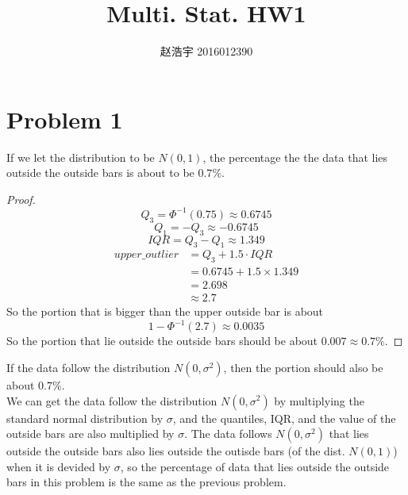 \message{ !name(hw1.tex)}\documentclass{article}
\title{\textbf{Multi. Stat. HW1}}
\author{赵浩宇 2016012390}
\date{}
\begin{document}

\begin{CJK}{UTF8}{gbsn}
  \maketitle
\end{CJK}

\section{Problem 1}
If we let the distribution to be $N(0,1)$, the percentage the the data that lies outside the outside bars is about to be $0.7\%$.
\begin{proof}
  \begin{equation*}
    Q_3  = \Phi^{-1}\left(0.75\right)
        \approx 0.6745
  \end{equation*}
  \begin{equation*}
    Q_1  = -Q_3
         \approx -0.6745
  \end{equation*}
  \begin{equation*}
    IQR  = Q_3 - Q_1
         \approx 1.349
  \end{equation*}
  \begin{align*}
    upper\_outlier  &= Q_3 + 1.5 \cdot IQR\\
                    &= 0.6745 + 1.5 \times 1.349\\
                    &= 2.698\\
                    &\approx 2.7
  \end{align*}
  So the portion that is bigger than the upper outside bar is about
  \begin{equation*}
    1 - \Phi^{-1}\left(2.7\right) \approx 0.0035
  \end{equation*}
  So the portion that lie outside the outside bars should be about $0.007 \approx 0.7\%$.
\end{proof}
If the data follow the distribution $N(0, \sigma^2)$, then the portion should also be about $0.7\%$.\\
 We can get the data follow the distribution $N(0,\sigma^2)$ by multiplying the standard normal distribution by $\sigma$, and the quantiles, IQR, and the value of the outside bars are also multiplied by $\sigma$. The data follows $N(0,\sigma^2)$ that lies outside the outside bars also lies outside the outisde bars (of the dist. $N(0,1)$) when it is devided by $\sigma$, so the percentage of data that lies outside the outside bars in this problem is the same as the previous problem.
\clearpage
\end{document}

